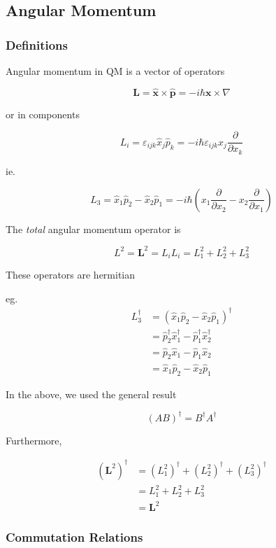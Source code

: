 \documentclass[a4paper]{article}
\begin{document}
\subsection{Angular Momentum}

\subsubsection{Definitions}

Angular momentum in QM is a vector of operators

\[ \mathbf{L} = \hat{\mathbf{x}} \times \hat{\mathbf{p}} = - i \hbar \mathbf{x} \times \nabla \]

or in components

\[ L_{i} = \varepsilon_{ijk} \hat{x}_{j} \hat{p}_{k} = - i \hbar \varepsilon_{ijk} x_{j} \frac{\partial }{\partial x_{k}}   \]

ie.

\[ L_{3} = \hat{x}_{1}\hat{p}_{2} - \hat{x}_{2}\hat{p}_{1} = - i \hbar \left(  x_{1} \frac{\partial }{\partial x_{2}}  - x_{2} \frac{\partial }{\partial x_{1}} \right)  \]

The \emph{total} angular momentum operator is 

\[ L^{2} = \mathbf{L}^{2} = L_{i}L_{i} = L_{1}^{2} + L_{2}^{2} + L_{3}^{2} \]

These operators are hermitian

eg. \begin{align*}
L_{3}^{\dag} & = (\hat{x}_{1}\hat{p}_{2}  - \hat{x}_{2}\hat{p}_{1} )^{\dag}  \\
& = \hat{p}_{2}^{\dag} \hat{x}_{1}^{\dag} - \hat{p}_{1}^{\dag} \hat{x}_{2}^{\dag} \\
& = \hat{p}_{2}\hat{x}_{1} - \hat{p}_{1}\hat{x}_{2} \\
& = \hat{x}_{1} \hat{p}_{2} - \hat{x}_{2} \hat{p}_{1}
\end{align*}

In the above, we used the general result

\[ (AB)^{\dag} = B^{\dag} A^{\dag} \]

Furthermore,

\begin{align*}
(\mathbf{L}^{2})^{\dag}  & =  (L_{1}^{2})^{\dag} + (L_{2}^{2})^{\dag} + (L_{3}^{2})^{\dag} \\
& = L_{1}^{2} + L_{2}^{2} + L_{3}^{2} \\
& = \mathbf{L}^{2}
\end{align*}


\subsubsection{Commutation Relations}
\end{document}
